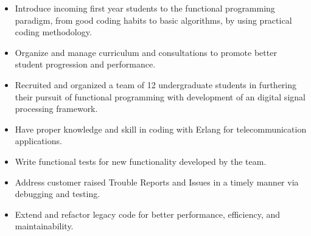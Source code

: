 \documentclass[10pt,a4paper]{altacv}
\begin{document}

\begin{fullwidth}
\makecvheader
\end{fullwidth}




\small{
\begin{itemize}
\item Introduce incoming first year students to the functional programming paradigm, from good coding habits to basic algorithms, by using practical coding methodology.
\item Organize and manage curriculum and consultations to promote better student progression and performance.
\item Recruited and organized a team of 12 undergraduate students in furthering their pursuit of functional programming with development of an digital signal processing framework.  
\end{itemize}
}
\divider

\small{
\begin{itemize}
\item Have proper knowledge and skill in coding with Erlang for telecommunication applications.

\item Write functional tests for new functionality developed by the team.

\item Address customer raised Trouble Reports and Issues in a timely manner via debugging and testing.

\item Extend and refactor legacy code for better performance, efficiency, and maintainability.

\end{itemize}
}
\end{document}
